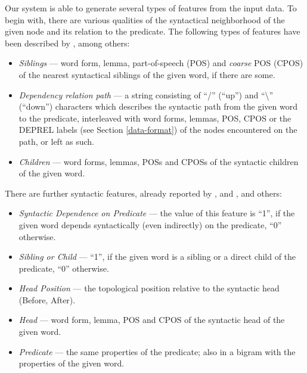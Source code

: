 \documentclass[12pt,notitlepage,a4paper]{report}
\begin{document}
Our system is able to generate several types of features from the input data. To begin with, there are various qualities of the syntactical neighborhood of the given node and its relation to the predicate. The following types of features have been described by \citet{nugues09}, among others:
\begin{itemize}
    \item \emph{Siblings} --- word form, lemma, part-of-speech (POS) and \emph{coarse} POS (CPOS) \citep[first character of the POS-tag;][]{che09} of the nearest syntactical siblings of the given word, if there are some.
    \item \emph{Dependency relation path} --- a string consisting of ``/'' (``up'') and ``\textbackslash'' (``down'') characters which describes the syntactic path from the given word to the predicate, interleaved with word forms, lemmas, POS, CPOS or the DEPREL labels (see Section \ref{data-format}) of the nodes encountered on the path, or left as such.
    \item \emph{Children} --- word forms, lemmas, POSs and CPOSs of the syntactic children of the given word.
\end{itemize}

There are further syntactic features, already reported by \citet{zeman09}, \citet{chen09} and \citet{asahara09}, and others:
\begin{itemize}
    \item \emph{Syntactic Dependence on Predicate} --- the value of this feature is ``1'', if the given word depends syntactically (even indirectly) on the predicate, ``0'' otherwise.
    \item \emph{Sibling or Child} --- ``1'', if the given word is a sibling or a direct child of the predicate, ``0'' otherwise.
    \item \emph{Head Position} --- the topological position relative to the syntactic head (Before, After).
    \item \emph{Head} --- word form, lemma, POS and CPOS of the syntactic head of the given word.
    \item \emph{Predicate} --- the same properties of the predicate; also in a bigram with the properties of the given word.
\end{itemize}
\end{document}
